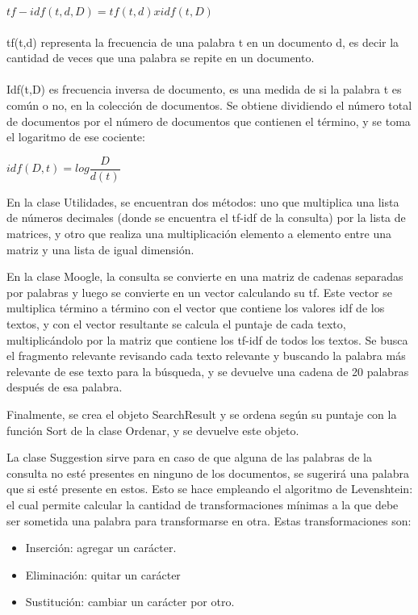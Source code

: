 \documentclass{article}
\begin{document}
\vspace{10pt}

 $tf-idf(t,d,D) = tf(t,d) x idf(t,D)$\\ \\tf(t,d) representa la frecuencia de una palabra t en un documento d, es decir la 
cantidad de veces que una palabra se repite en un documento.\\ \\Idf(t,D) es frecuencia inversa de documento, es una medida de si la palabra t es 
común o no, en la colección de documentos. Se obtiene dividiendo el número total 
de documentos por el número de documentos que contienen el término, y se toma 
el logaritmo de ese cociente:

\vspace{10pt}

$idf(D,t) = log\dfrac{D}{d(t)}$

\vspace{10pt}

En la clase Utilidades, se encuentran dos métodos: uno que multiplica una lista de 
números decimales (donde se encuentra el tf-idf de la consulta) por la lista de 
matrices, y otro que realiza una multiplicación elemento a elemento entre una 
matriz y una lista de igual dimensión.

\vspace{10pt}

En la clase Moogle, la consulta se convierte en una matriz de cadenas separadas 
por palabras y luego se convierte en un vector calculando su tf. Este vector se 
multiplica término a término con el vector que contiene los valores idf de los textos, 
y con el vector resultante se calcula el puntaje de cada texto, multiplicándolo por 
la matriz que contiene los tf-idf de todos los textos. Se busca el fragmento relevante 
revisando cada texto relevante y buscando la palabra más relevante de ese texto 
para la búsqueda, y se devuelve una cadena de 20 palabras después de esa palabra.

\vspace{10pt}

Finalmente, se crea el objeto SearchResult y se ordena según su puntaje con la 
función Sort de la clase Ordenar, y se devuelve este objeto. 

\vspace{10pt}

La clase Suggestion sirve para en caso de que alguna de las palabras de la consulta 
no esté presentes en ninguno de los documentos, se sugerirá una palabra que si 
esté presente en estos. Esto se hace empleando el algoritmo de Levenshtein: el 
cual permite calcular la cantidad de transformaciones mínimas a la que debe ser 
sometida una palabra para transformarse en otra. Estas transformaciones son:

\begin{itemize}
	\item  Inserción: agregar un carácter.
	\item  Eliminación: quitar un carácter
	\item  Sustitución: cambiar un carácter por otro.
\end{itemize}
\end{document}
